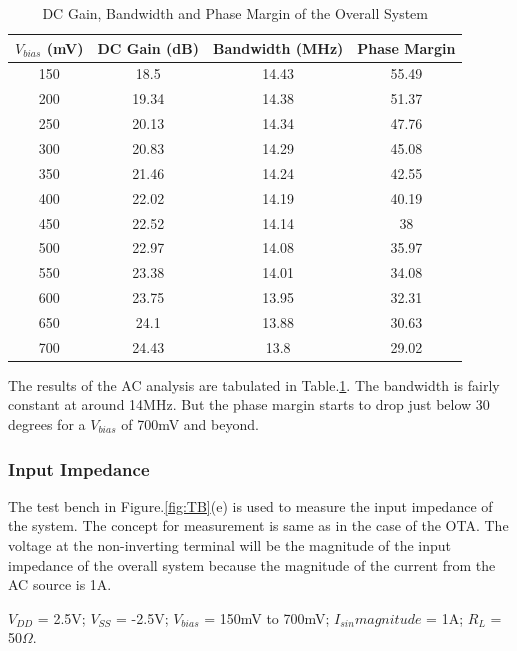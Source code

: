 \begin{table} [H]
\centering
\begin{tabular}{@{}cccc@{}}
\toprule
$V_{bias}$ (mV)			& DC Gain (dB) 	& Bandwidth (MHz) 	& Phase Margin \\ \midrule
150					& 18.5  		& 14.43 			& 55.49 \\
200					& 19.34			& 14.38 			& 51.37 \\
250					& 20.13  		& 14.34 			& 47.76 \\
300					& 20.83	 		& 14.29 			& 45.08 \\
350					& 21.46			& 14.24 			& 42.55 \\
400					& 22.02	 		& 14.19 			& 40.19 \\
450					& 22.52 		& 14.14 			& 38	\\
500					& 22.97 		& 14.08 			& 35.97	\\
550					& 23.38 		& 14.01 			& 34.08 \\
600					& 23.75 		& 13.95 			& 32.31 \\
650					& 24.1 			& 13.88 			& 30.63 \\
700 				& 24.43 		& 13.8  			& 29.02 \\
\bottomrule
\end{tabular}
\caption{DC Gain, Bandwidth and Phase Margin of the Overall System}
\label{tab:GAIN_GBW_PM}
\end{table}
The results of the AC analysis are tabulated in Table.\ref{tab:GAIN_GBW_PM}. The bandwidth is fairly constant at around 14MHz. But the phase margin starts to drop just below 30 degrees for a $V_{bias}$ of 700mV and beyond. 

\subsubsection{Input Impedance}
The test bench in Figure.\ref{fig:TB}(e) is used to measure the input impedance of the system. The concept for measurement is same as in the case of the OTA. The voltage at the non-inverting terminal will be the magnitude of the input impedance of the overall system because the magnitude of the current from the AC source is 1A.

$V_{DD}$ = 2.5V; $V_{SS}$ = -2.5V; $V_{bias}$ = 150mV to 700mV;  $I_{sin} magnitude$ = 1A; $R_{L}$ = 50$\Omega$.

